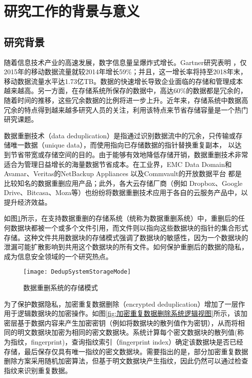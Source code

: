 \section{研究工作的背景与意义}
\subsection{研究背景}

随着信息技术产业的高速发展，数字信息量呈爆炸式增长。Gartner研究表明 ，仅2015年的移动数据流量就较2014年增长59\%；并且，这一增长率将持至2018年末，移动数据流量水平达1.73亿TB。数据的快速增长导致企业面临的存储和管理成本越来越高。另一方面，在存储系统所保存的数据中，高达60\%的数据都是冗余的，随着时间的推移，这些冗余数据的比例将进一步上升。近年来，存储系统中数据高冗余的特点得到越来越多研究人员的关注，利用该特点来节省存储容量是一个热门研究课题。

数据重删技术（data deduplication）是指通过识别数据流中的冗余，只传输或存储唯一数据（unique data），而使用指向已存储数据的指针替换重复副本， 以达到节省带宽或存储空间的目的。由于能够有效地降低存储开销，数据重删技术非常适合为管理日益增长的海量数据节省成本。在工业界，EMC Data Domain和Avamar、Veritas的NetBackup Appliances 以及Commvault的开放数据平台 都是比较知名的数据重删应用产品；此外，各大云存储厂商（例如 Dropbox、Google Drive、Bitcasa、Moza等）也纷纷将数据重删技术应用于各自的云服务产品中，以提升经济效益。

如图\ref{fig:数据重删系统的存储模式}所示，在支持数据重删的存储系统（统称为数据重删系统）中，重删后的任何数据块都被一个或多个文件引用，而文件则以指向这些数据块的指针的集合形式存储。这种文件共用数据块的存储模式强调了数据块的敏感性，因为一个数据块的泄漏可能扩散影响到共用这个数据块的所有文件。如何保护重删后的数据的隐私，成为信息安全领域的一个研究热点。

\begin{figure}[!htb]
    \small
    \centering
    \texttt{[image: DedupSystemStorageMode]}
    \caption{数据重删系统的存储模式} 
    \label{fig:数据重删系统的存储模式}
\end{figure}

为了保护数据隐私，加密重复数据删除（encrypted deduplication）增加了一层作用于逻辑数据块的加密操作。如图\ref{fig:加密重复数据删除系统逻辑视图}所示，该加密层基于数据内容来产生加密密钥（例如将数据块的散列值作为密钥），从而将相同的明文数据块加密为相同的密文数据块。系统计算每个密文数据块的散列值(称为指纹，fingerprint)，查询指纹索引（fingerprint index）确定该数据块是否已经存储，最后保存仅具有唯一指纹的密文数据块。需要指出的是，部分加密重复数据删除方案采用随机加密算法，但基于明文数据块产生指纹，因此仍然可以通过检查指纹来识别重复数据。

